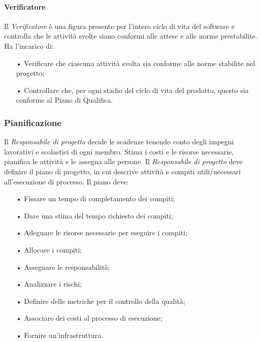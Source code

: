 \paragraph{Verificatore}
Il \textit{Verificatore} è una figura presente per l'intero ciclo di vita del software e controlla che le attività svolte siano conformi alle attese e alle norme prestabilite.  
\newline
Ha l'incarico di:
\begin{itemize}
\item[•] Verificare che ciascuna attività svolta sia conforme alle norme stabilite nel progetto;
\item[•] Controllare che, per ogni stadio del ciclo di vita del prodotto, questo sia conforme al Piano di Qualifica.
\end{itemize}

\subsubsection{Pianificazione}
Il \textit{Responsabile di progetto} decide le scadenze tenendo conto degli impegni lavorativi e scolastici di ogni membro. Stima i costi e le risorse necessarie, pianifica le attività e le assegna alle persone. 
\newline
Il \textit{Responsabile di progetto} deve definire il piano di progetto, in cui descrive attività e compiti utili/necessari all'esecuzione di processo.  
\newline
Il piano deve:
\begin{itemize}
\item[•] Fissare un tempo di completamento dei compiti;
\item[•] Dare una stima del tempo richiesto dei compiti;
\item[•] Adeguare le risorse necessarie per eseguire i compiti;
\item[•] Allocare i compiti;
\item[•] Assegnare le responsabilità; 
\item[•] Analizzare i rischi;
\item[•] Definire delle metriche per il controllo della qualità;
\item[•] Associare dei costi al processo di esecuzione;
\item[•] Fornire un'infrastruttura.
\end{itemize}

